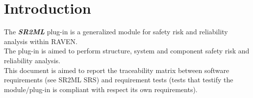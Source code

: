 \section{Introduction}
The \textbf{\textit{SR2ML}} plug-in is a generalized module for safety risk and reliability analysis within RAVEN.
\\The plug-in is aimed to perform structure, system and component safety risk and reliability analysis.
\\This document is aimed to report the traceability matrix between software requirements
(see SR2ML SRS) and requirement tests (tests that testify the module/plug-in is compliant
with respect its own requirements).
